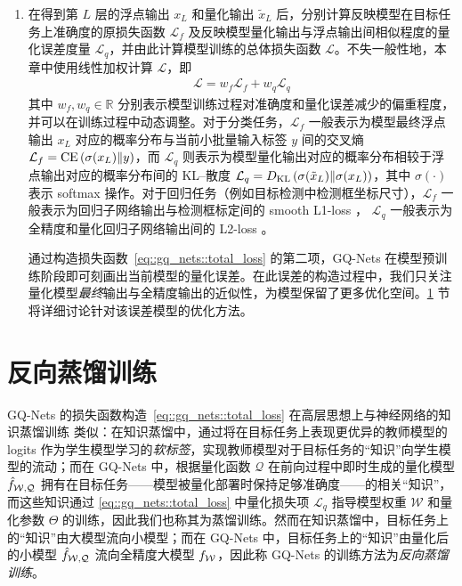 \begin{enumerate}[1.]
  \item 在得到第 $L$ 层的浮点输出 $x_L$ 和量化输出 $\tilde{x}_L$ 后，分别计算反映模型在目标任务上准确度的原损失函数 $\mathcal{L}_f$ 及反映模型量化输出与浮点输出间相似程度的量化误差度量 $\mathcal{L}_q$，并由此计算模型训练的总体损失函数 $\mathcal{L}$。不失一般性地，本章中使用线性加权计算 $\mathcal{L}$，即
  \begin{align}
    \mathcal{L} = w_f \mathcal{L}_f + w_q \mathcal{L}_q \label{eq::gq_nets::total_loss}
  \end{align}
  其中 $w_f, w_q \in \mathbb{R}$ 分别表示模型训练过程对准确度和量化误差减少的偏重程度，并可以在训练过程中动态调整。对于分类任务，$\mathcal{L}_f$ 一般表示为模型最终浮点输出 $x_L$ 对应的概率分布与当前小批量输入标签 $y$ 间的交叉熵 $\mathcal{L}_f = \mathrm{CE}\left( \sigma(x_L) \| y \right)$，而 $\mathcal{L}_q$ 则表示为模型量化输出对应的概率分布相较于浮点输出对应的概率分布间的 KL--散度 $\mathcal{L}_q = D_{\mathrm{KL}}\left( \sigma(\tilde{x}_L) \| \sigma(x_L) \right)$，其中 $\sigma(\cdot)$ 表示 softmax 操作。对于回归任务（例如目标检测中检测框坐标尺寸），$\mathcal{L}_f$ 一般表示为回归子网络输出与检测框标定间的 smooth L1-loss ， $\mathcal{L}_q$ 一般表示为全精度和量化回归子网络输出间的 L2-loss 。
  
  通过构造损失函数~\eqref{eq::gq_nets::total_loss} 的第二项，GQ-Nets 在模型预训练阶段即可刻画出当前模型的量化误差。在此误差的构造过程中，我们只关注量化模型\emph{最终}输出与全精度输出的近似性，为模型保留了更多优化空间。\ref{sec::gq_nets::train} 节将详细讨论针对该误差模型的优化方法。
\end{enumerate}
\section{反向蒸馏训练} \label{sec::gq_nets::train}
GQ-Nets 的损失函数构造~\eqref{eq::gq_nets::total_loss} 在高层思想上与神经网络的知识蒸馏训练 \citep{hinton2015distilling} 类似：在知识蒸馏中，通过将在目标任务上表现更优异的教师模型的 logits 作为学生模型学习的\emph{软标签}，实现教师模型对于目标任务的“知识”向学生模型的流动；而在 GQ-Nets 中，根据量化函数 $\mathcal{Q}$ 在前向过程中即时生成的量化模型 $\hat{f}_{\mathcal{W, Q}}$ 拥有在目标任务——模型被量化部署时保持足够准确度——的相关“知识”，而这些知识通过 \eqref{eq::gq_nets::total_loss} 中量化损失项 $\mathcal{L}_q$ 指导模型权重 $\mathcal{W}$ 和量化参数 $\Theta$ 的训练，因此我们也称其为蒸馏训练。然而在知识蒸馏中，目标任务上的“知识”由大模型流向小模型；而在 GQ-Nets 中，目标任务上的“知识”由量化后的小模型 $\hat{f}_{\mathcal{W, Q}}$ 流向全精度大模型 $f_{\mathcal{W}}$，因此称 GQ-Nets 的训练方法为\emph{反向蒸馏训练}。

